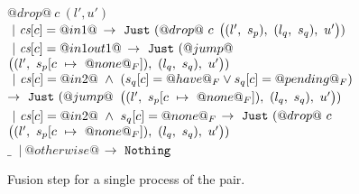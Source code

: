 \begin{figure*}
\begin{tabbing}
\> $@drop@~c~(l',u')$ \\
\> \> $~|~\cs[c]=@in1@$
\> \hspace{5em} $\to~\Just (@drop@~c$
\> \hspace{5em} $
      \nextStep
        {l'}
          {s_p}
        {l_q}
          {s_q}
        {u'})
      $
\>  \\

\> \> $~|~\cs[c]=@in1out1@$
\> \hspace{5em} $\to~\Just (@jump@$
\> \hspace{5em} $
      \nextStep
        {l'}
          {\HeapUpdateOne{c}{@none@_F}{s_p}}
        {l_q}
          {s_q}
        {u'})
      $
\> \\

\> \> $~|~\cs[c]=@in2@ ~\wedge~ (s_q[c]=@have@_F \vee s_q[c]=@pending@_F)$ 
\> \hspace{5em} $\to~\Just (@jump@$
\> \hspace{5em} $
      \nextStep
        {l'}
          {\HeapUpdateOne{c}{@none@_F}{s_p}}
        {l_q}
          {s_q}
        {u'})
      $
\> \\



\> \> $~|~\cs[c]=@in2@ ~\wedge~ s_q[c]=@none@_F$
\> \hspace{5em} $\to~\Just (@drop@~c$
\> \hspace{5em} $
      \nextStep
        {l'}
          {\HeapUpdateOne{c}{@none@_F}{s_p}}
        {l_q}
          {s_q}
        {u'})
      $
\> \\[1ex]

\> $\_$ \> $~|~ @otherwise@ $
\> \hspace{5em} $\to ~ \Nothing$
\> \> 

\end{tabbing}

\caption{Fusion step for a single process of the pair.} 

\label{fig:Fusion:Def:Step}
\end{figure*}

